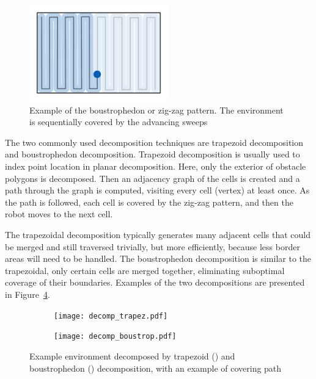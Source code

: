 \documentclass[buriama8_dp.tex]{subfiles}
\begin{document}
\begin{figure}[ht]
  \centering
  \includegraphics[width=6cm]{figures/zigzag.pdf}
  \caption[Boustrophedon pattern]{Example of the boustrophedon or zig-zag pattern. The environment is sequentially covered by the advancing sweeps}
  \label{fig:zig_pattern}
\end{figure}

The two commonly used decomposition techniques are trapezoid decomposition and boustrophedon decomposition. Trapezoid decomposition is usually used to index point location in planar decomposition. Here, only the exterior of obstacle polygons is decomposed. Then an adjacency graph of the cells is created and a path through the graph is computed, visiting every cell (vertex) at least once. As the path is followed, each cell is covered by the zig-zag pattern, and then the robot moves to the next cell.

The trapezoidal decomposition typically generates many adjacent cells that could be merged and still traversed trivially, but more efficiently, because less border areas will need to be handled. The boustrophedon decomposition is similar to the trapezoidal, only certain cells are merged together, eliminating suboptimal coverage of their boundaries. Examples of the two decompositions are presented in Figure~\ref{fig:decomps}.

\begin{figure}[ht]
  \begin{subfigure}[t]{0.4\textwidth}
    \texttt{[image: decomp\_trapez.pdf]}
    \caption{}
    \label{fig:decomp_trapez}
  \end{subfigure}
  \begin{subfigure}[t]{0.4\textwidth}
    \texttt{[image: decomp\_boustrop.pdf]}
    \caption{}
    \label{fig:decomp_boustrop}
  \end{subfigure}

  \caption[Trapezoid and boustrophedon decompositions]{Example environment decomposed by trapezoid () and boustrophedon () decomposition, with an example of covering path}
  \label{fig:decomps}
\end{figure}
\end{document}

